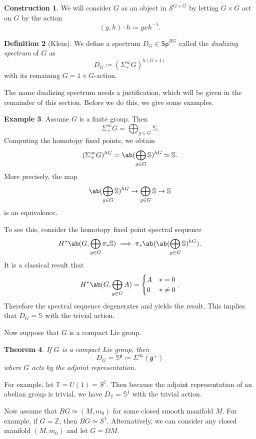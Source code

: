 \documentclass[10pt, oneside]{memoir}
\newtheorem{thm}{Theorem}[subsection]
\theoremstyle{definition}
\newtheorem{defn}[thm]{Definition}
\newtheorem{con}[thm]{Construction}
\newtheorem{exm}[thm]{Example}
\theoremstyle{remark}
\theoremstyle{plain}
\theoremstyle{definition}
\theoremstyle{remark}
\newcommand{\Z}{\mathbb{Z}}
\newcommand{\bS}{\mathbb{S}}
\newcommand{\g}{\mathfrak{g}}
\newcommand{\mc}[1]{\mathcal{#1}}
\newcommand{\T}{\mathbb{T}}
\newcommand{\ms}[1]{\mathsf{#1}}
\newcommand{\1}{\mathbf{1}}
\newcommand{\2}{\mathbf{2}}
\newcommand{\3}{\mathbf{3}}
\begin{document}
\begin{con}
    We will consider \(G \) as an object in \(\mc{S}^{G \times G} \) by letting \(G \times G \) act on \(G \) by the action 
    \[ (g,h) \cdot h \coloneqq gxh^{-1}. \]
\end{con}

\begin{defn}[Klein]
    We define a spectrum \(D_G \in \ms{Sp}^{BG} \) called the \textit{dualizing spectrum} of \(G \) as
    \[ D_G \coloneqq (\Sigma_+^{\infty} G)^{h(G \times 1)} \]
    with its remaining \(G = 1 \times G \)-action.
\end{defn}

The name dualizing spectrum needs a justification, which will be given in the remainder of this section. Before we do this, we give some examples.

\begin{exm}
    Assume \(G \) is a finite group. Then
    \[ \Sigma_+^{\infty} G = \bigoplus_{g \in G} \bS. \]
    Computing the homotopy fixed points, we obtain
    \[ (\Sigma_+^{\infty} G)^{hG} = \ab(\bigoplus_{g \in G} \bS)^{hG} \simeq \bS. \]
    More precisely, the map
    \[ \ab(\bigoplus_{g \in G} \bS)^{hG} \to \bigoplus_{g \in G} \bS \to \bS \]
    is an equivalence.

    To see this, consider the homotopy fixed point spectral sequence
    \[ H^* \ab(G, \bigoplus_{g \in G} \pi_* \bS) \implies \pi_* \ab(\ab(\bigoplus_{g \in G} \bS)^{hG}). \]
    It is a classical result that
    \[ H^*\ab(G, \bigoplus_{g \in G} A) = \begin{cases}
        A & *=0 \\
        0 & * \neq 0
    \end{cases}. \]
    Therefore the spectral sequence degenerates and yields the result. This implies that \(D_G = \bS \) with the trivial action.
\end{exm}

Now suppose that \(G \) is a compact Lie group.
\begin{thm}
    If \(G \) is a compact Lie group, then
    \[ D_G = \bS^{\g} \coloneqq \Sigma^{\infty}(\g^+) \]
    where \(G \) acts by the adjoint representation.
\end{thm}

For example, let \(\T = U(1) = S^1 \). Then because the adjoint representation of an abelian group is trivial, we have \(D_{\T} = \bS^1 \) with the trivial action.

Now assume that \(BG \simeq (M, m_0) \) for some closed smooth manifold \(M \). For example, if \(G = \Z \), then \(BG \simeq S^1 \). Alternatively, we can consider any closed manifold \((M, m_0) \) and let \(G = \Omega M \).
\end{document}
